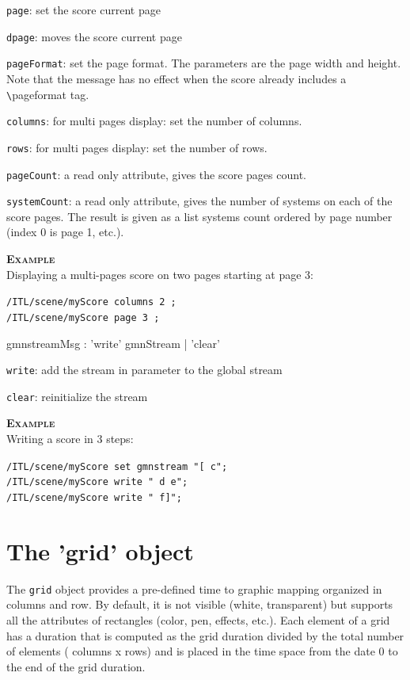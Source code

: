 \documentclass[a4paper,twoside]{report}
\newcommand{\sublevel}[1]	{\section{#1}}
\newcommand{\OSC}[1]		{\texttt{#1}}
\newcommand{\example}		{\textbf{\hspace{-1.5cm}\textbf{\textsc{Example }}}}
\let\olditemize\itemize
\let\oldenditemize\enditemize
\renewenvironment{itemize} 	{\olditemize \setlength{\itemsep}{1mm}}{\oldenditemize}
\newcommand{\sample}	[1]			{\vspace{-2mm}\begin{center}\colorbox{mygrey}{
								\begin{minipage}[t]{0.9\columnwidth} 
								{\small \texttt{#1}}
								\end{minipage}}\end{center}}
\begin{document}
\begin{itemize}
\item \OSC{page}: set the score current page
\item \OSC{dpage}: moves the score current page
\item \OSC{pageFormat}: set the page format. The parameters are the page width and height. Note that the message has no effect when the score already includes a \verb+\+pageformat tag.
\item \OSC{columns}: for multi pages display: set the number of columns.
\item \OSC{rows}: for multi pages display: set the number of rows.
\item \OSC{pageCount}:  a read only attribute, gives the score pages count.
\item \OSC{systemCount}:  a read only attribute, gives the number of systems on each of the score pages. The result is given as a list systems count ordered by page number (index 0 is page 1, etc.).
\end{itemize}


\example \\
Displaying a multi-pages score on two pages starting at page 3:
\sample{/ITL/scene/myScore columns 2 ;\\
/ITL/scene/myScore page 3 ;
}


\begin{rail}
gmnstreamMsg :      'write' gmnStream
				| 'clear' 
\end{rail}

\begin{itemize}
\item \OSC{write}: add the stream in parameter to the global stream
\item \OSC{clear}: reinitialize the stream
\end{itemize}


\example \\
Writing a score in 3 steps:
\sample{/ITL/scene/myScore set gmnstream "[ c"; \\
/ITL/scene/myScore write " d e";\\
/ITL/scene/myScore write " f]";
}


\sublevel{The 'grid' object}
\label{grid}

The \OSC{grid} object provides a pre-defined time to graphic mapping organized in columns and row. By default, it is not visible (white, transparent) but supports all the attributes of rectangles (color, pen, effects, etc.). Each element of a grid has a duration that is computed as the grid duration divided by the total number of elements ( columns x rows) and is placed in the time space from the date 0 to the end of the grid duration.
\end{document}
